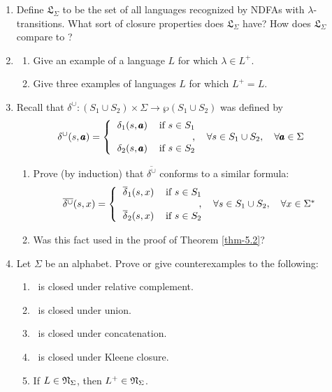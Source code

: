 \begin{enumerate}[{5.}1. ]
\item Define $\mathfrak{L}_\Sigma$ to be the set of all languages recognized by
NDFAs with $\lambda$-transitions. What sort of closure properties does
$\mathfrak{L}_\Sigma$ have? How does $\mathfrak{L}_\Sigma$ compare to \DSIG?

\item \begin{enumerate}
\item Give an example of a language $L$ for which $\lambda \in L^+$.
\item Give three examples of languages $L$ for which $L^+ = L$.
\end{enumerate}

\item Recall that $\delta^\cup$$: (S_1 \cup S_2) \times \Sigma \rightarrow
\wp(S_1 \cup S_2)$ was defined by
\[ \delta^\cup(s,\pmb{a}) = \left\{\begin{tabular}{lrl}
	$\delta_1(s,\pmb{a})$ & if $s \in S_1$ & \\
	& , & $\forall s \in S_1 \cup S_2,\quad \forall\pmb{a} \in \Sigma$ \\
	$\delta_2(s,\pmb{a})$ & if $s \in S_2$ &
	\end{tabular}\right. \]
\begin{enumerate}
\item Prove (by induction) that $\overline{\delta^\cup}$ conforms to a similar formula:
\[ \overline{\delta^\cup}(s,x) = \left\{\begin{tabular}{lrl}
	$\DBAR_1(s,x)$ & if $s \in S_1$ & \\
	& , & $\forall s \in S_1 \cup S_2,\quad \forall x \in \Sigma^*$ \\
	$\DBAR_2(s,x)$ & if $s \in S_2$ &
	\end{tabular}\right. \]
\item Was this fact used in the proof of Theorem \ref{thm-5.2}?
\end{enumerate}

\item Let $\Sigma$ be an alphabet. Prove or give counterexamples to the
following:
\begin{enumerate}
\item \NSIG\ is closed under relative complement.
\item \NSIG\ is closed under union.
\item \NSIG\ is closed under concatenation.
\item \NSIG\ is closed under Kleene closure.
\item If $L \in \mathfrak{N}_\Sigma$, then $L^+ \in \mathfrak{N}_\Sigma$.
\end{enumerate}


\end{enumerate}
